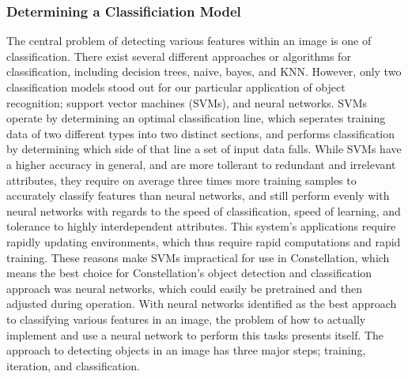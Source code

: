 \subsubsection{Determining a Classificiation Model}
The central problem of detecting various features within an image is one of classification. There exist several different approaches or algorithms for classification, including decision trees, naive, bayes, and KNN. However, only two classification models stood out for our particular application of object recognition; support vector machines (SVMs), and neural networks. SVMs operate by determining an optimal classification line, which seperates training data of two different types into two distinct sections, and performs classification by determining which side of that line a set of input data falls. While SVMs have a higher accuracy in general, and are more tollerant to redundant and irrelevant attributes, they require on average three times more training samples to accurately classify features than neural networks, and still perform evenly with neural networks with regards to the speed of classification, speed of learning, and tolerance to highly interdependent attributes. This system's applications require rapidly updating environments, which thus require rapid computations and rapid training. These reasons make SVMs impractical for use in Constellation, which means the best choice for Constellation's object detection and classification approach was neural networks, which could easily be pretrained and then adjusted during operation. With neural networks identified as the best approach to classifying various features in an image, the problem of how to actually implement and use a neural network to perform this tasks presents itself. The approach to detecting objects in an image has three major steps; training, iteration, and classification.

